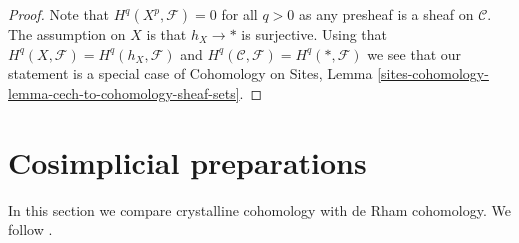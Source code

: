 \begin{proof}
Note that $H^q(X^p, \mathcal{F}) = 0$ for all $q > 0$ as any presheaf is a
sheaf on $\mathcal{C}$. The assumption on $X$ is that $h_X \to *$
is surjective. Using that $H^q(X, \mathcal{F}) = H^q(h_X, \mathcal{F})$ and
$H^q(\mathcal{C}, \mathcal{F}) = H^q(*, \mathcal{F})$ we see that our
statement is a special case of
Cohomology on Sites,
Lemma \ref{sites-cohomology-lemma-cech-to-cohomology-sheaf-sets}.
\end{proof}









\section{Cosimplicial preparations}
\label{section-cohomology}

\noindent
In this section we compare crystalline cohomology with de Rham
cohomology. We follow \cite{Bhatt}.

